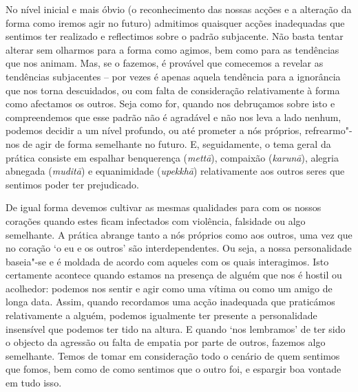 No nível inicial e mais óbvio (o reconhecimento das nossas acções e a alteração
da forma como iremos agir no futuro) admitimos quaisquer acções inadequadas que
sentimos ter realizado e reflectimos sobre o padrão subjacente. Não basta tentar
alterar sem olharmos para a forma como agimos, bem como para as tendências que
nos animam. Mas, se o fazemos, é provável que comecemos a revelar as tendências
subjacentes -- por vezes é apenas aquela tendência para a ignorância que nos
torna descuidados, ou com falta de consideração relativamente à forma como
afectamos os outros. Seja como for, quando nos debruçamos sobre isto e
compreendemos que esse padrão não é agradável e não nos leva a lado nenhum,
podemos decidir a um nível profundo, ou até prometer a nós próprios,
refrearmo"-nos de agir de forma semelhante no futuro. E, seguidamente, o tema
geral da prática consiste em espalhar benquerença (\emph{mettā}), compaixão
(\emph{karunā}), alegria abnegada (\emph{muditā}) e equanimidade
(\emph{upekkhā}) relativamente aos outros seres que sentimos poder ter
prejudicado.

De igual forma devemos cultivar as mesmas qualidades para com os nossos corações
quando estes ficam infectados com violência, falsidade ou algo semelhante. A
prática abrange tanto a nós próprios como aos outros, uma vez que no coração `o
eu e os outros' são interdependentes. Ou seja, a nossa personalidade baseia"-se e
é moldada de acordo com aqueles com os quais interagimos. Isto certamente
acontece quando estamos na presença de alguém que nos é hostil ou acolhedor:
podemos nos sentir e agir como uma vítima ou como um amigo de longa data. Assim,
quando recordamos uma acção inadequada que praticámos relativamente a alguém,
podemos igualmente ter presente a personalidade insensível que podemos ter tido
na altura. E quando `nos lembramos' de ter sido o objecto da agressão ou falta
de empatia por parte de outros, fazemos algo semelhante. Temos de tomar em
consideração todo o cenário de quem sentimos que fomos, bem como de como
sentimos que o outro foi, e espargir boa vontade em tudo isso.

